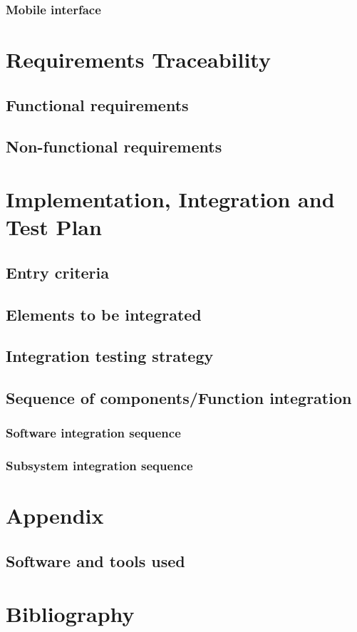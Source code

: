 \documentclass{article}
\begin{document}
	\subsubsection{Mobile interface}


	\section{Requirements Traceability}


	\subsection{Functional requirements}


	\subsection{Non-functional requirements}


	\section{Implementation, Integration and Test Plan}


	\subsection{Entry criteria}


	\subsection{Elements to be integrated}


	\subsection{Integration testing strategy}


	\subsection{Sequence of components/Function integration}


	\subsubsection{Software integration sequence}


	\subsubsection{Subsystem integration sequence}


	\appendix
	\section{Appendix}

	
	\subsection{Software and tools used}
	

	\section{Bibliography}
\end{document}
